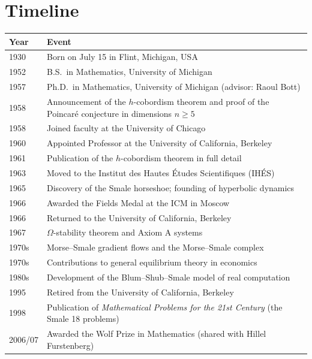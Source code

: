 \section*{Timeline}

\begin{tabularx}{\linewidth}{|p{1.5cm}|>{\raggedright\arraybackslash}X|}
\hline
\textbf{Year} & \textbf{Event} \\ \hline
1930 & Born on July 15 in Flint, Michigan, USA \\ \hline
1952 & B.S.\ in Mathematics, University of Michigan \\ \hline
1957 & Ph.D.\ in Mathematics, University of Michigan (advisor: Raoul Bott) \\ \hline
1958 & Announcement of the \(h\)-cobordism theorem and proof of the Poincar\'e conjecture in dimensions \(n \geq 5\) \\ \hline
1958 & Joined faculty at the University of Chicago \\ \hline
1960 & Appointed Professor at the University of California, Berkeley \\ \hline
1961 & Publication of the \(h\)-cobordism theorem in full detail \\ \hline
1963 & Moved to the Institut des Hautes \'Etudes Scientifiques (IH\'ES) \\ \hline
1965 & Discovery of the Smale horseshoe; founding of hyperbolic dynamics \\ \hline
1966 & Awarded the Fields Medal at the ICM in Moscow \\ \hline
1966 & Returned to the University of California, Berkeley \\ \hline
1967 & \(\Omega\)-stability theorem and Axiom A systems \\ \hline
1970s & Morse--Smale gradient flows and the Morse--Smale complex \\ \hline
1970s & Contributions to general equilibrium theory in economics \\ \hline
1980s & Development of the Blum--Shub--Smale model of real computation \\ \hline
1995 & Retired from the University of California, Berkeley \\ \hline
1998 & Publication of \textit{Mathematical Problems for the 21st Century} (the Smale 18 problems) \\ \hline
2006/07 & Awarded the Wolf Prize in Mathematics (shared with Hillel Furstenberg) \\ \hline
\end{tabularx}


